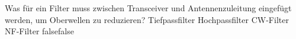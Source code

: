     {Was für ein Filter muss zwischen Transceiver und Antennenzuleitung eingefügt werden, um Oberwellen zu reduzieren?}
    {Tiefpassfilter}
    {Hochpassfilter}
    {CW-Filter}
    {NF-Filter}
    {false}{false}